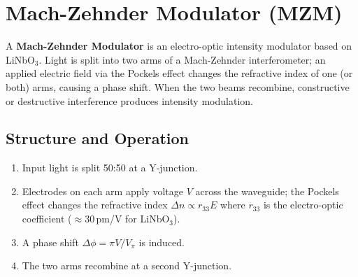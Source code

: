 \documentclass[12pt,a4paper]{article}
\begin{document}
\begin{tcolorbox}[tikzbox, title={Directional Coupler --- Power Transfer Along Coupling Length}]
\centering
{}
\end{tcolorbox}

\section{Mach-Zehnder Modulator (MZM)}

\begin{tcolorbox}[defbox, title={\textbf{Mach-Zehnder Modulator (MZM)}}]
A \textbf{Mach-Zehnder Modulator} is an electro-optic intensity modulator based on LiNbO$_3$. Light is split into two arms of a Mach-Zehnder interferometer; an applied electric field via the Pockels effect changes the refractive index of one (or both) arms, causing a phase shift. When the two beams recombine, constructive or destructive interference produces intensity modulation.
\end{tcolorbox}

\subsection{Structure and Operation}
\begin{enumerate}[leftmargin=*, itemsep=3pt, label=\textbf{\arabic*.}]
  \item Input light is split 50:50 at a Y-junction.
  \item Electrodes on each arm apply voltage $V$ across the waveguide; the Pockels effect changes the refractive index $\Delta n \propto r_{33} E$ where $r_{33}$ is the electro-optic coefficient ($\approx 30$\,pm/V for LiNbO$_3$).
  \item A phase shift $\Delta\phi = \pi V / V_\pi$ is induced.
  \item The two arms recombine at a second Y-junction.
\end{enumerate}
\end{document}

